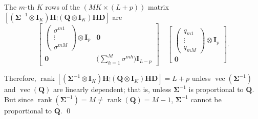 The $m$-th $K$ rows of the $(MK \times (L+p))$ matrix
$[(\boldsymbol{\Sigma}^{-1} \otimes \mathbf{I}_K)\mathbf{H} \vdots (\mathbf{Q} \otimes \mathbf{I}_K)\mathbf{H}\mathbf{D}]$
are
\begin{equation}
  \begin{bmatrix}
    \begin{pmatrix} \sigma^{m1} \\ \vdots \\ \sigma^{mM} \end{pmatrix} \otimes \mathbf{I}_p
    & \mathbf{0} \\
    \mathbf{0}
    & \bigl(\sum_{h=1}^{M}\sigma^{mh}\bigr)\mathbf{I}_{L-p}
  \end{bmatrix}
  \quad
  \begin{bmatrix}
    \begin{pmatrix} q_{m1} \\ \vdots \\ q_{mM} \end{pmatrix} \otimes \mathbf{I}_p \\
    \mathbf{0}
  \end{bmatrix}.
  \label{eq:5.A.15} \tag{5.A.15}
\end{equation}

Therefore,
$\operatorname{rank}[(\boldsymbol{\Sigma}^{-1} \otimes \mathbf{I}_K)\mathbf{H}
\vdots (\mathbf{Q} \otimes \mathbf{I}_K)\mathbf{H}\mathbf{D}] = L + p$
unless $\operatorname{vec}(\boldsymbol{\Sigma}^{-1})$ and
$\operatorname{vec}(\mathbf{Q})$ are linearly dependent; that is, unless $\boldsymbol{\Sigma}^{-1}$
is proportional to $\mathbf{Q}$. But since
$\operatorname{rank}(\boldsymbol{\Sigma}^{-1}) = M \neq \operatorname{rank}(\mathbf{Q}) = M - 1$,
$\boldsymbol{\Sigma}^{-1}$ cannot be proportional to $\mathbf{Q}$. \qed
